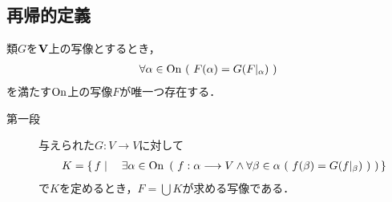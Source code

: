 \subsection{再帰的定義}
	\begin{screen}
		\begin{thm}[超限帰納法による写像の構成]\label{thm:transfinite_recursion_theorem}
			類$G$を$\mathbf{V}$上の写像とするとき，
			\begin{align}
				\forall \alpha \in \mathrm{On}\ (\ F(\alpha) = G(F|_\alpha)\ )
			\end{align}
			を満たす$\mathrm{On}$上の写像$F$が唯一つ存在する．
		\end{thm}
	\end{screen}
	
	\begin{prf}\mbox{}
		\begin{description}
			\item[第一段] 与えられた$G:V \longrightarrow V$に対して
				\begin{align}
					K = \left\{\, f \mid \quad \exists \alpha \in \mathrm{On}\ \left(\ f:\alpha \longrightarrow V \wedge \forall \beta \in \alpha\ (\ f(\beta) = G(f|_\beta)\ )\ \right)\, \right\}
				\end{align}
				で$K$を定めるとき，$F = \bigcup K$が求める写像である．
				

\end{description}
\end{prf}
